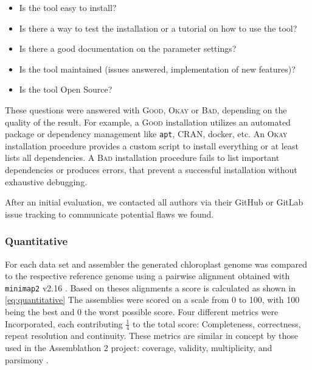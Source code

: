 \documentclass{bmcart}
\newcommand{\ok}{\textsc{Okay}}
\newcommand{\bad}{\textsc{Bad}}
\newcommand{\good}{\textsc{Good}}
\begin{document}
\begin{itemize}
    \item Is the tool easy to install? 
    \item Is there a way to test the installation or a tutorial on how to use the tool? 
    \item Is there a good documentation on the parameter settings? 
    \item Is the tool maintained (issues answered, implementation of new features)? 
    \item Is the tool Open Source?
\end{itemize}
\newline
These questions were answered with \good{}, \ok{} or \bad{}, depending on the quality of the result. 
For example, a \good{} installation utilizes an automated package or dependency management like \texttt{apt}, CRAN, docker, etc.
An \ok{} installation procedure provides a custom script to install everything or at least lists all dependencies.
A \bad{} installation procedure fails to list important dependencies or produces errors, that prevent a successful installation without exhaustive debugging.

After an initial evaluation, we contacted all authors via their GitHub or GitLab issue tracking to communicate potential flaws we found.

\subsubsection*{Quantitative}

%



For each data set and assembler the generated chloroplast genome was compared to the respective reference genome using a pairwise alignment obtained with \texttt{minimap2} v2.16 \cite{li2018minimap2}. Based on theses alignments a score is calculated as shown in \cref{eq:quantitative}
The assemblies were scored on a scale from 0 to 100, with 100 being the best and 0 the worst possible score. Four different metrics were Incorporated, each contributing  $\frac{1}{4}$ to the total score: Completeness, correctness, repeat resolution and continuity.
These metrics are similar in concept by those used in the Assemblathon 2 project: coverage, validity, multiplicity, and parsimony \cite{assemblathon2}.
\end{document}
